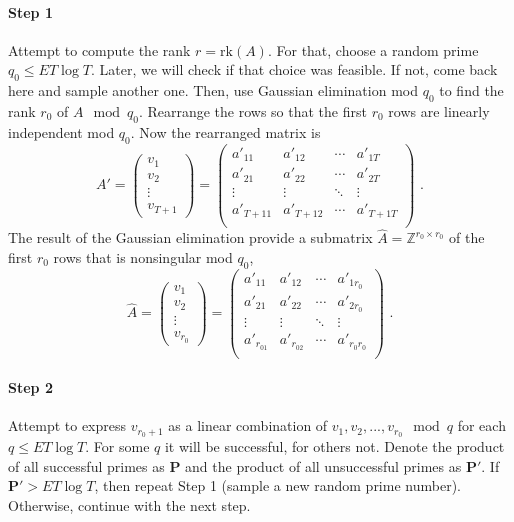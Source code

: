 \documentclass[paper=a4, fontsize=11pt]{scrartcl} %
\numberwithin{equation}{section} %
\numberwithin{figure}{section} %
\numberwithin{table}{section} %
\begin{document}
\paragraph{Step 1}Attempt to compute the rank $r = \mathrm{rk}(A)$. For that, choose a random prime $q_0\leq ET\log T$. Later, we will check if that choice was feasible. If not, come back here and sample another one. Then, use Gaussian elimination mod $q_0$ to find the rank $r_0$ of $A\mod q_0$. Rearrange the rows so that the first $r_0$ rows are linearly independent mod $q_0$. Now the rearranged matrix is
\begin{equation}
A' =
\begin{pmatrix}
v_1\\v_2\\\vdots\\v_{T\!+\!1}
\end{pmatrix}
=
\begin{pmatrix}
a'_{11} & a'_{12} & \cdots & a'_{1T} \\
a'_{21} & a'_{22} & \cdots & a'_{2T} \\
\vdots & \vdots & \ddots & \vdots \\
a'_{T\!+\!11} & a'_{T\!+\!12} & \cdots & a'_{T\!+\!1T} \\
\end{pmatrix}
\text{ .}
\end{equation}
The result of the Gaussian elimination provide a submatrix $\hat{A} = \mathbb{Z}^{r_0\times r_0}$ of the first $r_0$ rows that is nonsingular mod $q_0$,
\begin{equation}
\hat{A} =
\begin{pmatrix}
v_1\\v_2\\\vdots\\v_{r_0}
\end{pmatrix}
=
\begin{pmatrix}
a'_{11} & a'_{12} & \cdots & a'_{1r_0} \\
a'_{21} & a'_{22} & \cdots & a'_{2r_0} \\
\vdots & \vdots & \ddots & \vdots \\
a'_{r_01} & a'_{r_02} & \cdots & a'_{r_0r_0} \\
\end{pmatrix}
\text{ .}
\end{equation}
\paragraph{Step 2} Attempt to express $v_{r_0+1}$ as a linear combination of $v_1,v_2,...,v_{r_0}\mod q$ for each $q\leq ET\log T$. For some $q$ it will be successful, for others not. Denote the product of all successful primes as $\boldsymbol{P}$ and the product of all unsuccessful primes as $\boldsymbol{P'}$. If $\boldsymbol{P'} > ET\log T$, then repeat Step 1 (sample a new random prime number). Otherwise, continue with the next step.
\end{document}
